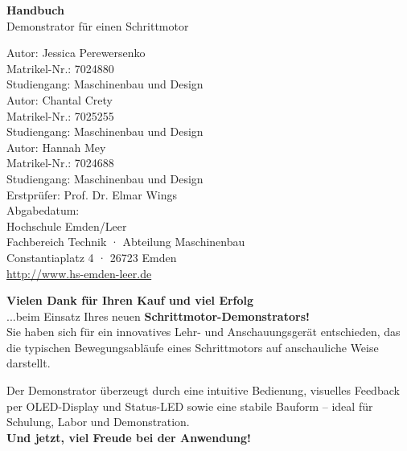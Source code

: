 \documentclass[a4paper,12pt]{report}
\begin{document}
	
	\begin{titlepage}
		\centering
		\vspace*{2cm}
		{\Huge \textbf{Handbuch}}\\[1.5cm]
		{\LARGE Demonstrator für einen Schrittmotor}\\[4cm]
		\begin{flushleft}
			\large
			Autor: Jessica Perewersenko\\
			Matrikel-Nr.: 7024880\\
			Studiengang: Maschinenbau und Design\\[1cm]
			
			Autor: Chantal Crety\\
			Matrikel-Nr.: 7025255\\
			Studiengang: Maschinenbau und Design\\[1cm]
			
			Autor: Hannah Mey\\
			Matrikel-Nr.: 7024688\\
			Studiengang: Maschinenbau und Design\\[1.5cm]
			
			
			Erstprüfer: Prof. Dr. Elmar Wings\\
			Abgabedatum: \\[1.5cm]
			
			Hochschule Emden/Leer\\
			Fachbereich Technik · Abteilung Maschinenbau\\
			Constantiaplatz 4 · 26723 Emden\\
			\url{http://www.hs-emden-leer.de}
		\end{flushleft}
	\end{titlepage}
	
	\vspace*{\fill}
	\begin{center}
		\begin{tcolorbox}[
			colback=white!95!gray,
			colframe=black,
			width=0.9\textwidth,
			boxrule=0.5mm,
			arc=2mm,
			auto outer arc,
			drop shadow
			]
			\textbf{Vielen Dank für Ihren Kauf und viel Erfolg} \\
			...beim Einsatz Ihres neuen \textbf{Schrittmotor-Demonstrators!}\\[1em]
			
			Sie haben sich für ein innovatives Lehr- und Anschauungsgerät entschieden, das die typischen Bewegungsabläufe eines Schrittmotors auf anschauliche Weise darstellt.  
			
			Der Demonstrator überzeugt durch eine intuitive Bedienung, visuelles Feedback per OLED-Display und Status-LED sowie eine stabile Bauform – ideal für Schulung, Labor und Demonstration.\\
			
			\medskip
			\centering
			\textbf{Und jetzt, viel Freude bei der Anwendung!}
		\end{tcolorbox}
	\end{center}
	\vspace*{\fill}
	
\end{document}
